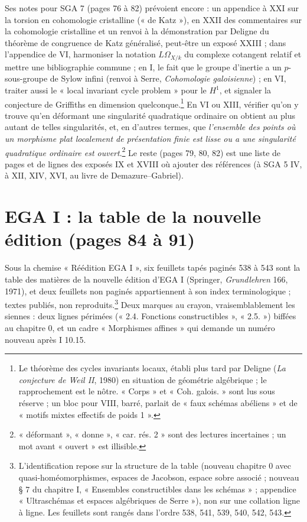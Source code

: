\documentclass[11pt,a4paper]{article}
\begin{document}
Ses notes pour SGA 7 (pages 76 à 82) prévoient encore : un appendice à XXI
sur la torsion en cohomologie cristalline (« de Katz »), en XXII des
commentaires sur la cohomologie cristalline et un renvoi à la démonstration
par Deligne du théorème de congruence de Katz généralisé, peut-être un exposé
XXIII ; dans l'appendice de VI, harmoniser la notation $L\Omega_{X/k}$ du
complexe cotangent relatif et mettre une bibliographie commune ; en I, le fait
que le groupe d'inertie a un $p$-sous-groupe de Sylow infini (renvoi à Serre,
\emph{Cohomologie galoisienne}) ; en VI, traiter aussi le « local invariant
cycle problem » pour le $H^1$, et signaler la conjecture de Griffiths en
dimension quelconque.\footnote{Le théorème des cycles invariants locaux,
établi plus tard par Deligne (\emph{La conjecture de Weil II}, 1980) en
situation de géométrie algébrique ; le rapprochement est le nôtre. « Corps »
et « Coh. galois. » sont lus sous réserve ; un bloc pour VIII, barré, parlait
de « faux schémas abéliens » et de « motifs mixtes effectifs de poids 1 ».}
En VI ou XIII, vérifier qu'on y trouve qu'en déformant une singularité
quadratique ordinaire on obtient au plus autant de telles singularités, et,
en d'autres termes, que \emph{l'ensemble des points où un morphisme plat
localement de présentation finie est lisse ou a une singularité quadratique
ordinaire est ouvert}.\footnote{« déformant », « donne », « car. rés. 2 » sont
des lectures incertaines ; un mot avant « ouvert » est illisible.}
Le reste (pages 79, 80, 82) est une liste de pages et de lignes des exposés
IX et XVIII où ajouter des références (à SGA 5 IV, à XII, XIV, XVI, au livre
de Demazure--Gabriel).

\section*{EGA I : la table de la nouvelle édition (pages 84 à 91)}

Sous la chemise « Réédition EGA I », six feuillets tapés paginés 538 à 543
sont la table des matières de la nouvelle édition d'EGA I (Springer,
\emph{Grundlehren} 166, 1971), et deux feuillets non paginés appartiennent à
son index terminologique ; textes publiés, non reproduits.\footnote{L'identification
repose sur la structure de la table (nouveau chapitre 0 avec
quasi-homéomorphismes, espaces de Jacobson, espace sobre associé ; nouveau
§ 7 du chapitre I, « Ensembles constructibles dans les schémas » ; appendice
« Ultraschémas et espaces algébriques de Serre »), non sur une collation ligne
à ligne. Les feuillets sont rangés dans l'ordre 538, 541, 539, 540, 542, 543.}
Deux marques au crayon, vraisemblablement les siennes : deux lignes périmées
(« 2.4. Fonctions constructibles », « 2.5. ») biffées au chapitre 0, et un
cadre « Morphismes affines » qui demande un numéro nouveau après I 10.15.
\end{document}
